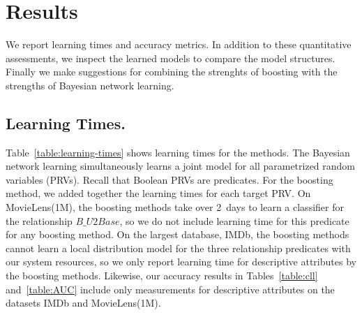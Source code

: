 \documentclass[runningheads,a4paper]{llncs}
\begin{document}
\section{Results} 
%


We report learning times and accuracy metrics. In addition to these quantitative assessments, we inspect the learned models to compare the model structures. Finally we make suggestions for combining the strenghts of boosting with the strengths of Bayesian network learning. 


\subsection{Learning Times.} Table~\ref{table:learning-times} shows learning times for the methods. The Bayesian network  learning simultaneously learns a joint model for all parametrized random variables (PRVs). Recall that Boolean PRVs are predicates. For the boosting method, we added together the learning times for each target PRV. 
On MovieLens(1M), the boosting methods take over 2~days to learn a classifier for the relationship $B\_U2Base$, so we do not include learning time for this predicate for any boosting method.
On the largest database, IMDb, the boosting methods cannot learn a local distribution model for the three relationship predicates with our system resources, so we only report learning time for descriptive attributes by the boosting methods. Likewise, our accuracy results in Tables~\ref{table:cll} and~\ref{table:AUC} include only measurements for descriptive attributes on the datasets IMDb and MovieLens(1M).
\end{document}
